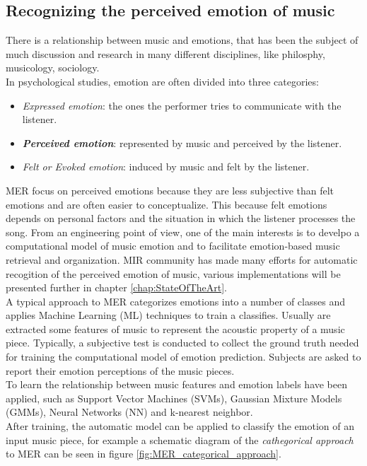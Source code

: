 \subsection{Recognizing the perceived emotion of music}
There is a relationship between music and emotions, that has been the subject of much discussion and research in many different disciplines, like philosphy, musicology, sociology.
\\
In psychological studies, emotion are often divided into three categories:
\begin{itemize}
	\item \textit{Expressed emotion}: the ones the performer tries to communicate with the listener.
	\item \textit{\textbf{Perceived emotion}}: represented by music and perceived by the listener.
	\item \textit{Felt or Evoked emotion}: induced by music and felt by the listener.
\end{itemize}

MER focus on perceived emotions because they are less subjective than felt emotions and are often easier to conceptualize. This because felt emotions depends on personal factors and the situation in which the listener processes the song.
From an engineering point of view, one of the main interests is to develpo a computational model of music emotion and to facilitate emotion-based music retrieval and organization. MIR community has made many efforts for automatic recogition of the perceived emotion of music, various implementations will be presented further in chapter \ref{chap:StateOfTheArt}.
\\
A typical approach to MER categorizes emotions into a number of classes and applies Machine Learning (ML) techniques to train a classifies. Usually are extracted some features of music to represent the acoustic property of a music piece. Typically, a subjective test is conducted to collect the ground truth needed for training the computational model of emotion prediction. Subjects are asked to report their emotion perceptions of the music pieces.
\\
To learn the relationship between music features and emotion labels have been applied, such as Support Vector Machines (SVMs), Gaussian Mixture Models (GMMs), Neural Networks (NN) and k-nearest neighbor.
\\
After training, the automatic model can be applied to classify the emotion of an input music piece, for example a schematic diagram of the \textit{cathegorical approach} to MER can be seen in figure \ref{fig:MER_categorical_approach}.


